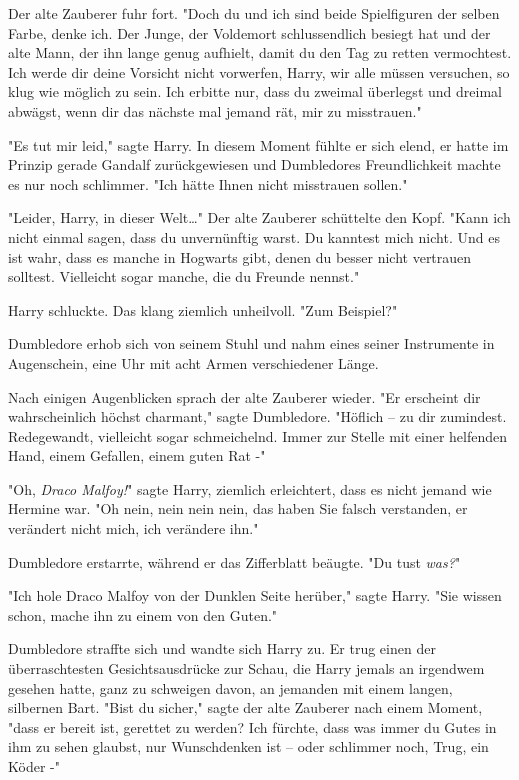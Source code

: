 {Der alte Zauberer fuhr fort. "Doch du und ich sind beide Spielfiguren der selben Farbe, denke ich. Der Junge, der Voldemort schlussendlich besiegt hat und der alte Mann, der ihn lange genug aufhielt, damit du den Tag zu retten vermochtest. Ich werde dir deine Vorsicht nicht vorwerfen, Harry, wir alle müssen versuchen, so klug wie möglich zu sein. Ich erbitte nur, dass du zweimal überlegst und dreimal abwägst, wenn dir das nächste mal jemand rät, mir zu misstrauen."

"Es tut mir leid," sagte Harry. In diesem Moment fühlte er sich elend, er hatte im Prinzip gerade Gandalf zurückgewiesen und Dumbledores Freundlichkeit machte es nur noch schlimmer. "Ich hätte Ihnen nicht misstrauen sollen."

"Leider, Harry, in dieser Welt…" Der alte Zauberer schüttelte den Kopf. "Kann ich nicht einmal sagen, dass du unvernünftig warst. Du kanntest mich nicht. Und es ist wahr, dass es manche in Hogwarts gibt, denen du besser nicht vertrauen solltest. Vielleicht sogar manche, die du Freunde nennst."

Harry schluckte. Das klang ziemlich unheilvoll. "Zum Beispiel?"

Dumbledore erhob sich von seinem Stuhl und nahm eines seiner Instrumente in Augenschein, eine Uhr mit acht Armen verschiedener Länge.

Nach einigen Augenblicken sprach der alte Zauberer wieder. "Er erscheint dir wahrscheinlich höchst charmant," sagte Dumbledore. "Höflich -- zu dir zumindest. Redegewandt, vielleicht sogar schmeichelnd. Immer zur Stelle mit einer helfenden Hand, einem Gefallen, einem guten Rat -"

"Oh, \emph{Draco Malfoy!}" sagte Harry, ziemlich erleichtert, dass es nicht jemand wie Hermine war. "Oh nein, nein nein nein, das haben Sie falsch verstanden, er verändert nicht mich, ich verändere ihn."

Dumbledore erstarrte, während er das Zifferblatt beäugte. "Du tust \emph{was?}"

"Ich hole Draco Malfoy von der Dunklen Seite herüber," sagte Harry. "Sie wissen schon, mache ihn zu einem von den Guten."

Dumbledore straffte sich und wandte sich Harry zu. Er trug einen der überraschtesten Gesichtsausdrücke zur Schau, die Harry jemals an irgendwem gesehen hatte, ganz zu schweigen davon, an jemanden mit einem langen, silbernen Bart. "Bist du sicher," sagte der alte Zauberer nach einem Moment, "dass er bereit ist, gerettet zu werden? Ich fürchte, dass was immer du Gutes in ihm zu sehen glaubst, nur Wunschdenken ist -- oder schlimmer noch, Trug, ein Köder -"

}
